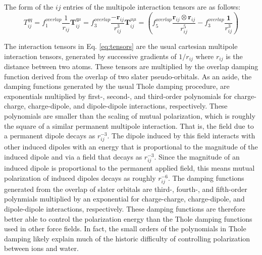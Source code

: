 \documentclass[journal=jacsat,manuscript=article]{achemso}
\begin{document}
The form of the $ij$ entries of the multipole interaction tensors are as follows:
\begin{subequations}
  \begin{equation}
    T^{qq}_{ij}=f_1^{overlap}\frac{1}{r_{ij}}
    \label{eq:tensors_a}
  \end{equation}
  \begin{equation}
  \bm{T}^{q\mu}_{ij}=f_3^{overlap}\frac{-\bm{r}_{ij}}{r_{ij}^3}
    \label{eq:tensors_b}
  \end{equation}
  \begin{equation}
  \bm{T}^{\mu\mu}_{ij}=\left(f_5^{overlap}\frac{\bm{r}_{ij}\otimes\bm{r}_{ij}}{r_{ij}^5}-f_3^{overlap}\frac{\bm{1}}{r_{ij}^3}\right)
    \label{eq:tensors_c}
  \end{equation}
  \label{eq:tensors}
\end{subequations}

The interaction tensors in Eq. \ref{eq:tensors} are the usual cartesian multipole interaction
tensors, generated by successive gradients of $1/r_{ij}$ where $r_{ij}$ is the distance between
two atoms. These tensors are multiplied by the overlap damping function derived from the overlap
of two slater pseudo-orbitals\cite{rackers2021polarizable}.
As an aside, the damping functions generated by the usual Thole damping procedure\cite{thole1981molecular},
are exponentials multiplied by first-, second-, and third-order polynomials
for charge-charge, charge-dipole, and dipole-dipole interactions, respectively.\cite{thole1981molecular}
These polynomials are smaller than the scaling of mutual polarization, which is roughly the square
of a similar permanent multipole interaction. That is, the field due to a permanent dipole
decays as $r_{ij}^{-3}$. The dipole induced by this field interacts with other induced dipoles
with an energy that is proportional to the magnitude of the induced dipole and via a field
that decays as $r_{ij}^{-3}$. Since the magnitude of an induced dipole is proportional to
the permanent applied field, this means mutual polarization of induced dipoles decays as roughly $r_{ij}^{-6}$.
The damping functions generated from the overlap of slater orbitals are
third-, fourth-, and fifth-order polynmials multiplied by an exponential for charge-charge, charge-dipole,
and dipole-dipole interactions, respectively. These damping functions are therefore better able
to control the polarization energy than the Thole damping functions used in other force fields.
In fact, the small orders of the polynomials in Thole damping likely explain much of the historic difficulty of controlling
polarization between ions and water.\cite{jiao2006simulation,mason2012accurate}
\end{document}
